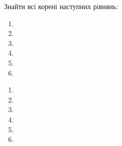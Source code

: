 \begin{problem}
	Знайти всі корені наступних рівнянь:
	\begin{enumerate}
		\item 
		\item 
		\item 
		\item 
		\item 
		\item 
	\end{enumerate}
\end{problem}
\begin{solution}
	\begin{enumerate}
		\item 
		\item 
		\item 
		\item 
		\item 
		\item 
	\end{enumerate}
\end{solution}

